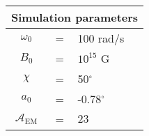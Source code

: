\begin{tabular}{ccl}
\multicolumn{3}{c}{Simulation parameters} \\
\hline
$\omega_0$  &=& 100 rad/s\\
$B_0$  &=& $10^{15}$ G \\
$\chi$  &=& 50$^{\circ}$ \\
$a_0$ &=& -0.78$^{\circ}$ \\
$\mathcal{A}_{\mathrm{EM}}$ &= & $23$
\end{tabular}
